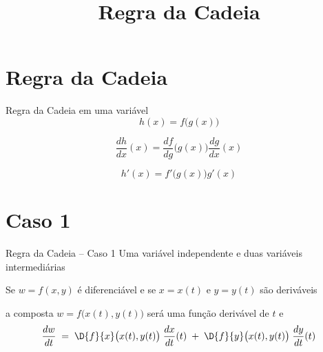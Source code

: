 
\usepackage{calculo_varias_variaveis-1}

\title{Regra da Cadeia}



\addtitle

\section{Regra da Cadeia}

\begin{frame}{Regra da Cadeia em uma variável}
    \[
        h(x) = f\big(g(x)\big)
    \]

    \pause
    \vspace{\baselineskip}
    \[
        \frac{dh}{dx}(x) = \frac{df}{dg}\big(g(x)\big)\frac{dg}{dx}(x)
    \]

    \pause
    \vspace{\baselineskip}
    \[
        h'(x) = f'\big(g(x)\big) g'(x)
    \]
\end{frame}

\section{Caso 1}

\begin{frame}{Regra da Cadeia -- Caso 1}
    Uma variável independente e duas variáveis intermediárias
    \vspace{\baselineskip}

    \pause
    Se \(w=f(x, y)\) é diferenciável
    \pause
    e se \(x=x(t)\) e \(y=y(t)\) são deriváveis

    \pause
    \vspace{.5\baselineskip}
    a composta \(w=f\big(x(t), y(t)\big)\) será uma função derivável de $t$ e
    \pause
    \[
        \frac{dw}{dt}
        \;=\; \D{f}{x}\big(x(t), y(t)\big)\; \frac{dx}{dt}(t)
        \;+\; \D{f}{y}\big(x(t), y(t)\big)\; \frac{dy}{dt}(t)
    \]
\end{frame}

